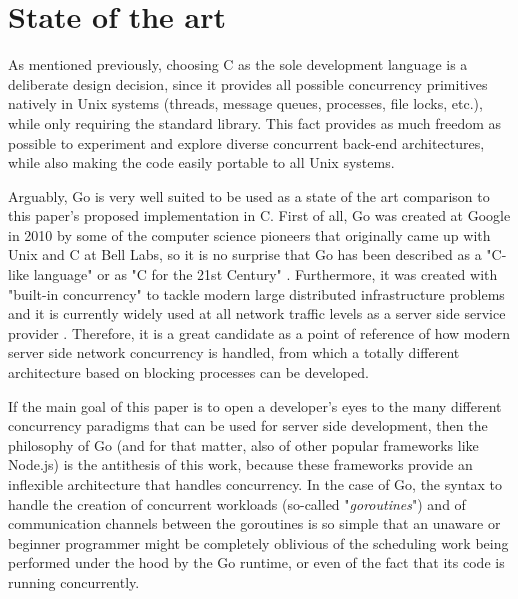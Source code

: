 \section{State of the art}
As mentioned previously, choosing C as the sole development language is a deliberate design decision, since it provides all possible concurrency primitives natively in Unix systems (threads, message queues, processes, file locks, etc.), while only requiring the standard library. This fact provides as much freedom as possible to experiment and explore diverse concurrent back-end architectures, while also making the code easily portable to all Unix systems.

Arguably, Go is very well suited to be used as a state of the art comparison to this paper's proposed implementation in C. First of all, Go was created at Google in 2010 by some of the computer science pioneers that originally came up with Unix and C at Bell Labs, so it is no surprise that Go has been described as a "C-like language" or as "C for the 21st Century" \cite{GoPL2015}. Furthermore, it was created with "built-in concurrency" to tackle modern large distributed infrastructure problems and it is currently widely used at all network traffic levels as a server side service provider \cite{Pike2012}. Therefore, it is a great candidate as a point of reference of how modern server side network concurrency is handled, from which a totally different architecture based on blocking processes can be developed. 

If the main goal of this paper is to open a developer's eyes to the many different concurrency paradigms that can be used for server side development, then the philosophy of Go (and for that matter, also of other popular frameworks like Node.js) is the antithesis of this work, because these frameworks provide an inflexible architecture that handles concurrency. In the case of Go, the syntax to handle the creation of concurrent workloads (so-called "\textit{goroutines}") and of communication channels between the goroutines is so simple that an unaware or beginner programmer might be completely oblivious of the scheduling work being performed under the hood by the Go runtime, or even of the fact that its code is running concurrently. 

